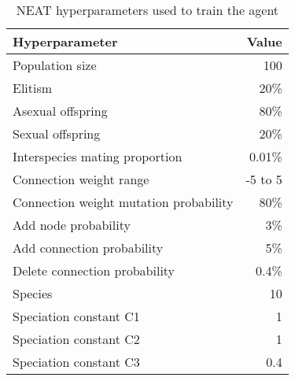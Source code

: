 
\begin{table}
\begin{center}
	\begin{tabular}{| l | r |}
		\hline
	
		\textbf{Hyperparameter} & \textbf{Value} \\ \hline
		Population size & 100 \\ \hline
		Elitism & 20\% \\ \hline
		Asexual offspring & 80\% \\ \hline
		Sexual offspring & 20\% \\ \hline
		Interspecies mating proportion & 0.01\% \\ \hline
		Connection weight range & -5 to 5 \\ \hline
		Connection weight mutation probability & 80\% \\ \hline
		Add node probability & 3\% \\ \hline
		Add connection probability & 5\% \\ \hline
		Delete connection probability & 0.4\% \\ \hline
		Species & 10 \\ \hline
		Speciation constant C1 & 1 \\ \hline
		Speciation constant C2 & 1 \\ \hline
		Speciation constant C3 & 0.4 \\ \hline
		
	\end{tabular}
\end{center}
\caption{NEAT hyperparameters used to train the agent}
\label{tab:neat-hyperparams}
\end{table}
